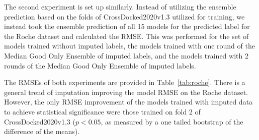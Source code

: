 \documentclass[journal=jcim,manuscript=article]{achemso}
\begin{document}
The second experiment is set up similarly.
Instead of utilizing the ensemble prediction based on the folds of CrossDocked2020v1.3 utilized for training, we instead took the ensemble prediction of all 15 models for the predicted label for the Roche dataset and calculated the RMSE.
This was performed for the set of models trained without imputed labels, the models trained with one round of the Median Good Only Ensemble of imputed labels, and the models trained with 2 rounds of the Median Good Only Ensemble of imputed labels.

The RMSEs of both experiments are provided in Table~\ref{tab:roche}.
There is a general trend of imputation improving the model RMSE on the Roche dataset.
However, the only RMSE improvement of the models trained with imputed data to achieve statistical significance were those trained on fold 2 of CrossDocked2020v1.3 ($p<0.05$, as measured by a one tailed bootstrap of the difference of the means).
\end{document}
